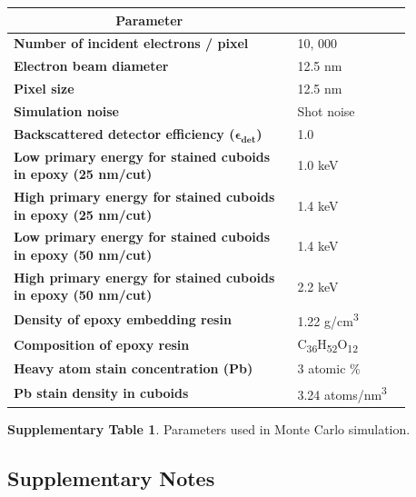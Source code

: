 \documentclass{article}
\begin{document}
\begin{center}
\small
\begin{tabular}{p{0.62\linewidth}p{0.25\linewidth}}
\toprule
\multicolumn{1}{c}{\textbf{Parameter}} & \\
\midrule
\textbf{Number of incident electrons / pixel} & 10, 000\\
\textbf{Electron beam diameter} & 12.5 nm\\
\textbf{Pixel size} & 12.5 nm\\
\textbf{Simulation noise} & Shot noise\\
\textbf{Backscattered detector efficiency (}$\boldsymbol{\epsilon_{det}}$\textbf{)} & 1.0\\
\textbf{Low primary energy for stained cuboids in epoxy (25 nm/cut)} & 1.0 keV\\
\textbf{High primary energy for stained cuboids in epoxy (25 nm/cut)} & 1.4 keV\\
\textbf{Low primary energy for stained cuboids in epoxy (50 nm/cut)} & 1.4 keV\\
\textbf{High primary energy for stained cuboids in epoxy (50 nm/cut)} & 2.2 keV\\
\textbf{Density of epoxy embedding resin} & 1.22 g/cm\textsuperscript{3}\\
\textbf{Composition of epoxy resin} & C\textsubscript{36}H\textsubscript{52}O\textsubscript{12}\\
\textbf{Heavy atom stain concentration (Pb)} & 3 atomic \%\\
\textbf{Pb stain density in cuboids} & 3.24 atoms/nm\textsuperscript{3}\\
\bottomrule
\end{tabular}
\end{center}
\noindent\textbf{Supplementary Table 1}. Parameters used in Monte Carlo simulation.

\subsection*{Supplementary Notes}
\end{document}
